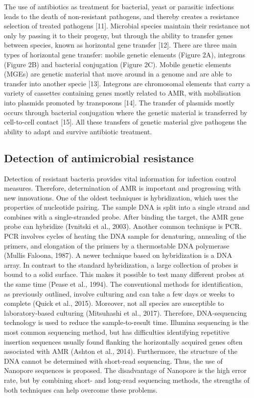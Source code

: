 \documentclass[a4paper,num-refs]{oup-contemporary}
\begin{document}
The use of antibiotics as treatment for bacterial, yeast or parasitic infections leads to the death of non-resistant pathogens, and thereby creates a resistance selection of treated pathogens [11]. Microbial species maintain their resistance not only by passing it to their progeny, but through the ability to transfer genes between species, known as horizontal gene transfer [12]. There are three main types of horizontal gene transfer: mobile genetic elements (Figure 2A), integrons (Figure 2B) and bacterial conjugation (Figure 2C). Mobile genetic elements (MGEs) are genetic material that move around in a genome and are able to transfer into another specie [13]. Integrons are chromosomal elements that carry a variety of cassettes containing genes mostly related to AMR, with mobilisation into plasmids promoted by transposons [14]. The transfer of plasmids mostly occurs through bacterial conjugation where the genetic material is transferred by cell-to-cell contact [15]. All these transfers of genetic material give pathogens the ability to adapt and survive antibiotic treatment.

\subsection{Detection of antimicrobial resistance}
Detection of resistant bacteria provides vital information for infection control measures. Therefore, determination of AMR is important and progressing with new innovations.  One of the oldest techniques is hybridization, which uses the properties of nucleotide pairing. The sample DNA is split into a single strand and combines with a single-stranded probe. After binding the target, the AMR gene probe can hybridize (Ivnitski et al., 2003). Another common technique is PCR. PCR involves cycles of heating the DNA sample for denaturing, annealing of the primers, and elongation of the primers by a thermostable DNA polymerase (Mullis  Faloona, 1987). A newer technique based on hybridization is a DNA array. In contrast to the standard hybridization, a large collection of probes is bound to a solid surface. This makes it possible to test many different probes at the same time (Pease et al., 1994). The conventional methods for identification, as previously outlined, involve culturing and can take a few days or weeks to complete (Quick et al., 2015). Moreover, not all species are susceptible to laboratory-based culturing (Mitsuhashi et al., 2017). Therefore, DNA-sequencing technology is used to reduce the sample-to-result time. Illumina sequencing is the most common sequencing method, but has difficulties identifying repetitive insertion sequences usually found flanking the horizontally acquired genes often associated with AMR (Ashton et al., 2014). Furthermore, the structure of the DNA cannot be determined with short-read sequencing. Thus, the use of Nanopore sequences is proposed. The disadvantage of Nanopore is the high error rate, but by combining short- and long-read sequencing methods, the strengths of both techniques can help overcome these problems.
\end{document}
